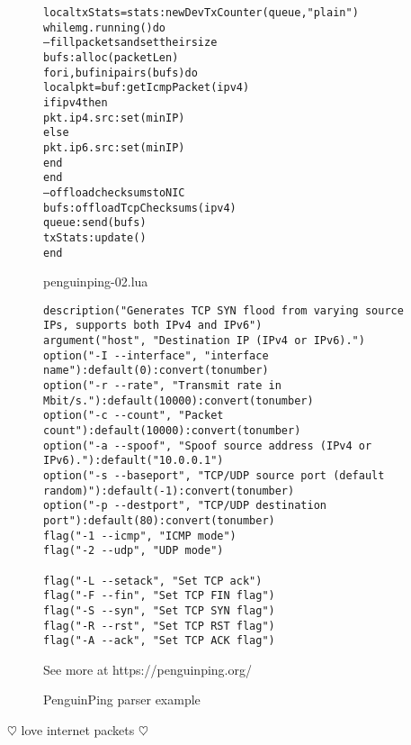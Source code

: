 \documentclass[12pt]{foils}
\begin{document}
\begin{figure}[!htb]
\centering
\begin{minipage}[t]{0.35\textwidth}
\vskip 12mm
\begin{alltt}\scriptsize
local txStats = stats:newDevTxCounter(queue, "plain")
while mg.running() do
        -- fill packets and set their size
        bufs:alloc(packetLen)
        for i, buf in ipairs(bufs) do
              local pkt = buf:getIcmpPacket(ipv4)
              if ipv4 then
                      pkt.ip4.src:set(minIP)
              else
                      pkt.ip6.src:set(minIP)
              end
        end
        --offload checksums to NIC
        bufs:offloadTcpChecksums(ipv4)
        queue:send(bufs)
        txStats:update()
end

\end{alltt}
\caption{penguinping-02.lua}
\end{minipage}%
\begin{minipage}[t]{0.50\textwidth}
\vskip 5mm
\begin{verbatim}
description("Generates TCP SYN flood from varying source IPs, supports both IPv4 and IPv6")
argument("host", "Destination IP (IPv4 or IPv6).")
option("-I --interface", "interface name"):default(0):convert(tonumber)
option("-r --rate", "Transmit rate in Mbit/s."):default(10000):convert(tonumber)
option("-c --count", "Packet count"):default(10000):convert(tonumber)
option("-a --spoof", "Spoof source address (IPv4 or IPv6)."):default("10.0.0.1")
option("-s --baseport", "TCP/UDP source port (default random)"):default(-1):convert(tonumber)
option("-p --destport", "TCP/UDP destination port"):default(80):convert(tonumber)
flag("-1 --icmp", "ICMP mode")
flag("-2 --udp", "UDP mode")

flag("-L --setack", "Set TCP ack")
flag("-F --fin", "Set TCP FIN flag")
flag("-S --syn", "Set TCP SYN flag")
flag("-R --rst", "Set TCP RST flag")
flag("-A --ack", "Set TCP ACK flag")
\end{verbatim}
\vskip -4mm\caption{PenguinPing parser example}
\centerline{See more at https://penguinping.org/}
\end{minipage}
\end{figure}
\vskip 13mm
\centerline{\Large $\heartsuit$ love internet packets $\heartsuit$}
\end{document}
